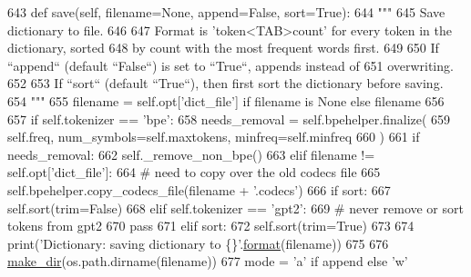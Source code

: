 \begin{DoxyCode}
643     \textcolor{keyword}{def }save(self, filename=None, append=False, sort=True):
644         \textcolor{stringliteral}{"""}
645 \textcolor{stringliteral}{        Save dictionary to file.}
646 \textcolor{stringliteral}{}
647 \textcolor{stringliteral}{        Format is 'token<TAB>count' for every token in the dictionary, sorted}
648 \textcolor{stringliteral}{        by count with the most frequent words first.}
649 \textcolor{stringliteral}{}
650 \textcolor{stringliteral}{        If ``append`` (default ``False``) is set to ``True``, appends instead of}
651 \textcolor{stringliteral}{        overwriting.}
652 \textcolor{stringliteral}{}
653 \textcolor{stringliteral}{        If ``sort`` (default ``True``), then first sort the dictionary before saving.}
654 \textcolor{stringliteral}{        """}
655         filename = self.opt[\textcolor{stringliteral}{'dict\_file'}] \textcolor{keywordflow}{if} filename \textcolor{keywordflow}{is} \textcolor{keywordtype}{None} \textcolor{keywordflow}{else} filename
656 
657         \textcolor{keywordflow}{if} self.tokenizer == \textcolor{stringliteral}{'bpe'}:
658             needs\_removal = self.bpehelper.finalize(
659                 self.freq, num\_symbols=self.maxtokens, minfreq=self.minfreq
660             )
661             \textcolor{keywordflow}{if} needs\_removal:
662                 self.\_remove\_non\_bpe()
663             \textcolor{keywordflow}{elif} filename != self.opt[\textcolor{stringliteral}{'dict\_file'}]:
664                 \textcolor{comment}{# need to copy over the old codecs file}
665                 self.bpehelper.copy\_codecs\_file(filename + \textcolor{stringliteral}{'.codecs'})
666             \textcolor{keywordflow}{if} sort:
667                 self.sort(trim=\textcolor{keyword}{False})
668         \textcolor{keywordflow}{elif} self.tokenizer == \textcolor{stringliteral}{'gpt2'}:
669             \textcolor{comment}{# never remove or sort tokens from gpt2}
670             \textcolor{keywordflow}{pass}
671         \textcolor{keywordflow}{elif} sort:
672             self.sort(trim=\textcolor{keyword}{True})
673 
674         print(\textcolor{stringliteral}{'Dictionary: saving dictionary to \{\}'}.\hyperlink{namespaceparlai_1_1chat__service_1_1services_1_1messenger_1_1shared__utils_a32e2e2022b824fbaf80c747160b52a76}{format}(filename))
675 
676         \hyperlink{namespaceparlai_1_1core_1_1build__data_a6ce042fedd4194bd016845bbe7a8facf}{make\_dir}(os.path.dirname(filename))
677         mode = \textcolor{stringliteral}{'a'} \textcolor{keywordflow}{if} append \textcolor{keywordflow}{else} \textcolor{stringliteral}{'w'}

\end{DoxyCode}

